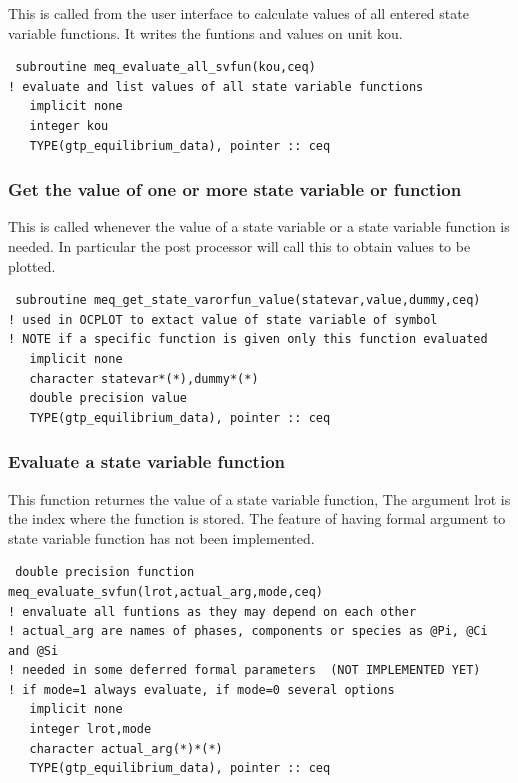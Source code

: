 \documentclass[12pt]{article}
\begin{document}
This is called from the user interface to calculate values of all
entered state variable functions.  It writes the funtions and values
on unit kou.

{\small
\begin{verbatim}
 subroutine meq_evaluate_all_svfun(kou,ceq)
! evaluate and list values of all state variable functions
   implicit none
   integer kou
   TYPE(gtp_equilibrium_data), pointer :: ceq
\end{verbatim}
}

\subsubsection{Get the value of one or more state variable or function}

This is called whenever the value of a state variable or
a state variable function is needed.  In particular the post
processor will call this to obtain values to be plotted.

{\small
\begin{verbatim}
 subroutine meq_get_state_varorfun_value(statevar,value,dummy,ceq)
! used in OCPLOT to extact value of state variable of symbol
! NOTE if a specific function is given only this function evaluated
   implicit none
   character statevar*(*),dummy*(*)
   double precision value
   TYPE(gtp_equilibrium_data), pointer :: ceq
\end{verbatim}
}

\subsubsection{Evaluate a state variable function}

This function returnes the value of a state variable function, The
argument lrot is the index where the function is stored.  The feature
of having formal argument to state variable function has not been
implemented.

{\small
\begin{verbatim}
 double precision function meq_evaluate_svfun(lrot,actual_arg,mode,ceq)
! envaluate all funtions as they may depend on each other
! actual_arg are names of phases, components or species as @Pi, @Ci and @Si
! needed in some deferred formal parameters  (NOT IMPLEMENTED YET)
! if mode=1 always evaluate, if mode=0 several options
   implicit none
   integer lrot,mode
   character actual_arg(*)*(*)
   TYPE(gtp_equilibrium_data), pointer :: ceq
\end{verbatim}
}
\end{document}
